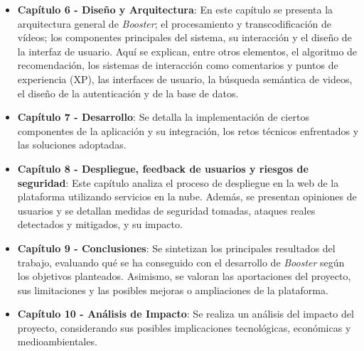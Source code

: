 \begin{itemize}
  \item \textbf{Capítulo 6 - Diseño y Arquitectura}: En este capítulo se presenta la arquitectura general de \textit{Booster}; el procesamiento y transcodificación de vídeos; los componentes principales del sistema, su interacción y el diseño de la interfaz de usuario. Aquí se explican, entre otros elementos, el algoritmo de recomendación, los sistemas de interacción como comentarios y puntos de experiencia (XP), las interfaces de usuario, la búsqueda semántica de videos, el diseño de la autenticación y de la base de datos.
  
  \item \textbf{Capítulo 7 - Desarrollo}: Se detalla la implementación de ciertos componentes de la aplicación y su integración, los retos técnicos enfrentados y las soluciones adoptadas.
  
  \item \textbf{Capítulo 8 - Despliegue, feedback de usuarios y riesgos de seguridad}: Este capítulo analiza el proceso de despliegue en la web de la plataforma utilizando servicios en la nube. Además, se presentan opiniones de usuarios y se detallan medidas de seguridad tomadas, ataques reales detectados y mitigados, y su impacto.
  
  \item \textbf{Capítulo 9 - Conclusiones}: Se sintetizan los principales resultados del trabajo, evaluando qué se ha conseguido con el desarrollo de \textit{Booster} según los objetivos planteados. Asimismo, se valoran las aportaciones del proyecto, sus limitaciones y las posibles mejoras o ampliaciones de la plataforma.
  
  \item \textbf{Capítulo 10 - Análisis de Impacto}: Se realiza un análisis del impacto del proyecto, considerando sus posibles implicaciones tecnológicas, económicas y medioambientales.
\end{itemize}


